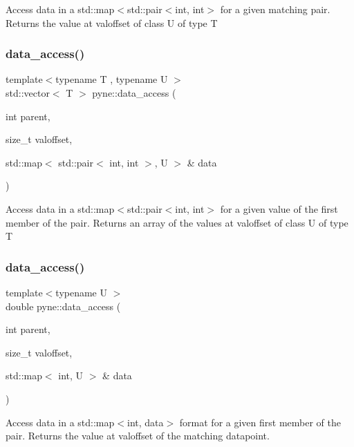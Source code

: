 Access data in a std\+::map$<$std\+::pair$<$int, int$>$ for a given matching pair. Returns the value at valoffset of class U of type T \mbox{\label{namespacepyne_a2eb8fd6ee7ec49c66d8f1c7b313b0a8a}} 
\subsubsection{\texorpdfstring{data\+\_\+access()}{data\_access()}\hspace{0.1cm}{\footnotesize\ttfamily [4/5]}}
{\footnotesize\ttfamily template$<$typename T , typename U $>$ \\
std\+::vector$<$ T $>$ pyne\+::data\+\_\+access (\begin{DoxyParamCaption}\item[{int}]{parent,  }\item[{size\+\_\+t}]{valoffset,  }\item[{std\+::map$<$ std\+::pair$<$ int, int $>$, U $>$ \&}]{data }\end{DoxyParamCaption})}

Access data in a std\+::map$<$std\+::pair$<$int, int$>$ for a given value of the first member of the pair. Returns an array of the values at valoffset of class U of type T \mbox{\label{namespacepyne_ab7cc1f6ac1c7ec2c4921fefacc5f0868}} 
\subsubsection{\texorpdfstring{data\+\_\+access()}{data\_access()}\hspace{0.1cm}{\footnotesize\ttfamily [5/5]}}
{\footnotesize\ttfamily template$<$typename U $>$ \\
double pyne\+::data\+\_\+access (\begin{DoxyParamCaption}\item[{int}]{parent,  }\item[{size\+\_\+t}]{valoffset,  }\item[{std\+::map$<$ int, U $>$ \&}]{data }\end{DoxyParamCaption})}

Access data in a std\+::map$<$int, data$>$ format for a given first member of the pair. Returns the value at valoffset of the matching datapoint. \mbox{\label{namespacepyne_a97a5a09f509c1eb64e5be5ed8e5de56d}} 
